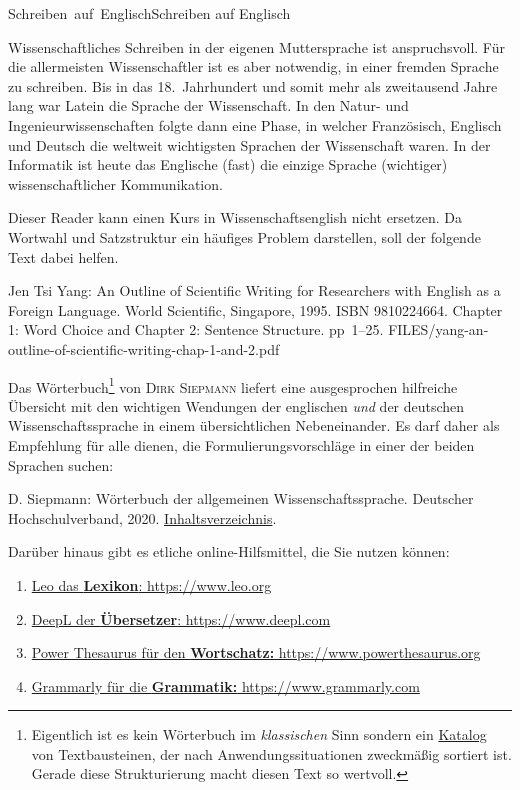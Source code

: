 

\unit{Schreiben auf Englisch}{Schreiben auf Englisch}

Wissenschaftliches Schreiben in der eigenen Muttersprache
ist anspruchsvoll.
Für die allermeisten Wissenschaftler ist es aber notwendig, in einer
fremden Sprache zu schreiben. Bis in das 18.\ Jahrhundert und somit mehr als
zweitausend Jahre lang war Latein die Sprache der Wissenschaft.
In den Natur- und Ingenieurwissenschaften folgte dann eine Phase, in welcher
Französisch, Englisch und Deutsch die weltweit wichtigsten Sprachen der
Wissenschaft waren. In der Informatik ist heute das Englische (fast) die einzige
Sprache (wichtiger) wissenschaftlicher Kommunikation.

Dieser Reader kann einen Kurs in Wissenschaftsenglish nicht ersetzen. Da Wortwahl und
Satzstruktur ein häufiges Problem darstellen, soll der folgende Text dabei helfen.

{Jen Tsi Yang: An Outline of Scientific Writing for Researchers
with English as a Foreign Language.
World Scientific, Singapore, 1995. ISBN 9810224664.
Chapter 1: Word Choice and Chapter 2: Sentence Structure. pp~1--25.}
{FILES/yang-an-outline-of-scientific-writing-chap-1-and-2.pdf}
{}

Das Wörterbuch\footnote{Eigentlich ist es kein Wörterbuch im \textit{klassischen} Sinn sondern ein 
\href{https://d-nb.info/1210187280/04}{Katalog}
von Textbausteinen, der nach Anwendungssituationen zweckmäßig sortiert ist. Gerade diese
Strukturierung macht diesen Text so wertvoll.
} 
von \textsc{Dirk Siepmann} liefert eine ausgesprochen hilfreiche Übersicht mit
den wichtigen Wendungen der englischen \textit{und} der deutschen Wissenschaftssprache in
einem übersichtlichen Nebeneinander. Es darf daher als Empfehlung für alle dienen,
die Formulierungsvorschläge in einer der beiden Sprachen suchen:

{D. Siepmann: Wörterbuch der allgemeinen Wissen\-schafts\-sprache. Deutscher Hochschulverband, 2020.}
{}
{\href{https://d-nb.info/1210187280/04}{Inhaltsverzeichnis}}.

Darüber hinaus gibt es etliche online-Hilfsmittel, die Sie nutzen können:
\begin{enumerate}
\item \href{https://www.leo.org}{Leo das \textbf{Lexikon}: https://www.leo.org}
\item \href{https://www.deepl.com}{DeepL der \textbf{Übersetzer}: https://www.deepl.com}
\item \href{https://www.powerthesaurus.org}{Power Thesaurus für den \textbf{Wortschatz:} https://www.powerthesaurus.org}
\item \href{https://www.grammarly.com}{Grammarly für die \textbf{Grammatik:} https://www.grammarly.com}
\end{enumerate}
